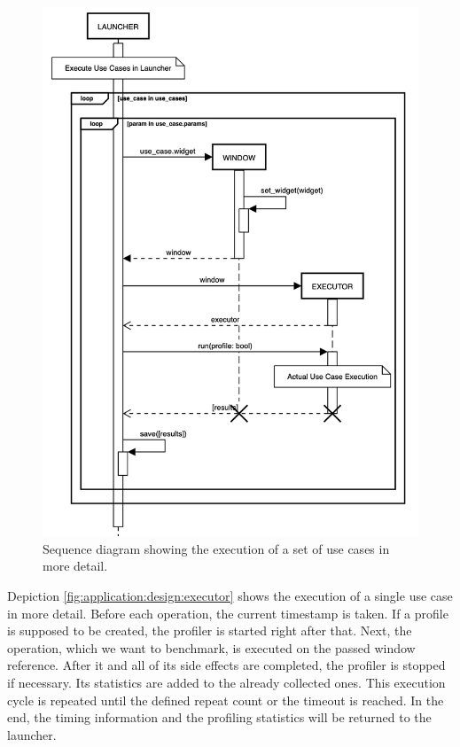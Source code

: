\begin{figure}[h]
    \centering
    \includegraphics[width=12cm]{resources/img/sequence/launcher}
    \caption{
        Sequence diagram showing the execution of a set of use cases in more
        detail.
    }
    \label{fig:application:design:launcher}
\end{figure}

Depiction \ref{fig:application:design:executor} shows the execution of a single
use case in more detail. Before each operation, the current timestamp is taken.
If a profile is supposed to be created, the profiler is started right after
that. Next, the operation, which we want to benchmark, is executed on the passed
window reference. After it and all of its side effects are completed, the
profiler is stopped if necessary. Its statistics are added to the already
collected ones. This execution cycle is repeated until the defined repeat count
or the timeout is reached. In the end, the timing information and the profiling
statistics will be returned to the launcher.

